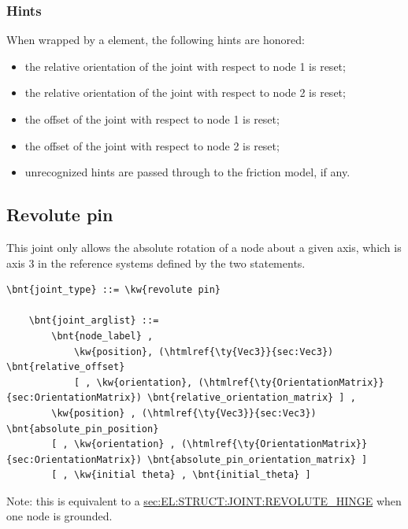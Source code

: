 \subsubsection{Hints}
When wrapped by a  element, the following hints are honored:
\begin{itemize}
\item {} the relative orientation of the joint
with respect to node 1 is reset;
\item {} the relative orientation of the joint
with respect to node 2 is reset;
\item {} the offset of the joint
with respect to node 1 is reset;
\item {} the offset of the joint
with respect to node 2 is reset;
\item unrecognized hints are passed through to the friction model,
if any.
\end{itemize}




\subsection{Revolute pin}
\label{sec:EL:STRUCT:JOINT:REVOLUTE_PIN}
This joint only allows the absolute rotation of a node about
a given axis, which is axis 3 in the reference systems defined 
by the two  statements.
\begin{Verbatim}[commandchars=\\\{\}]
    \bnt{joint_type} ::= \kw{revolute pin}

    \bnt{joint_arglist} ::= 
        \bnt{node_label} ,
            \kw{position}, (\htmlref{\ty{Vec3}}{sec:Vec3}) \bnt{relative_offset}
            [ , \kw{orientation}, (\htmlref{\ty{OrientationMatrix}}{sec:OrientationMatrix}) \bnt{relative_orientation_matrix} ] ,
        \kw{position} , (\htmlref{\ty{Vec3}}{sec:Vec3}) \bnt{absolute_pin_position}
        [ , \kw{orientation} , (\htmlref{\ty{OrientationMatrix}}{sec:OrientationMatrix}) \bnt{absolute_pin_orientation_matrix} ]
        [ , \kw{initial theta} , \bnt{initial_theta} ]
\end{Verbatim}
Note: this is equivalent to a
\hyperref{\kw{revolute hinge}}{\kw{revolute hinge} (see Section~}{)}{sec:EL:STRUCT:JOINT:REVOLUTE_HINGE}
when one node is grounded.

